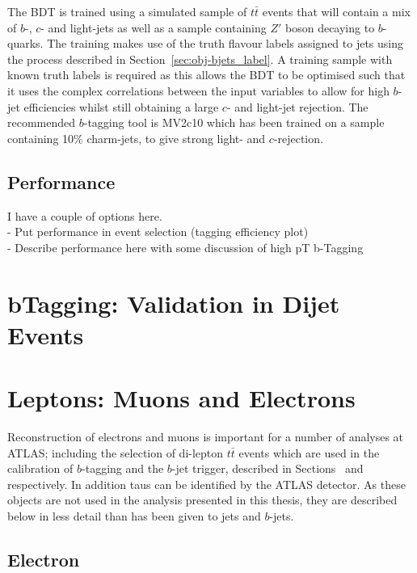 The BDT is trained using a simulated sample of $t\bar{t}$ events that will contain a mix of  $b$-, $c$- and light-jets
as well as a sample containing $Z'$ boson decaying to $b$-quarks.
The training makes use of the truth flavour labels assigned to jets using the process described in Section~\ref{sec:obj-bjets_label}.
A training sample with known truth labels is required as this allows the BDT to be optimised
such that it uses the complex correlations between the input variables to allow for high $b$-jet efficiencies
whilst still obtaining a large $c$- and light-jet rejection.
The recommended $b$-tagging tool is MV2c10 which has been trained on a sample containing 10\% charm-jets, to give strong light- and $c$-rejection.

\subsection{Performance}
\label{sec:obj-bjets_calib}

I have a couple of options here.\\
- Put performance in event selection (tagging efficiency plot)\\
- Describe performance here with some discussion of high pT b-Tagging

\section{bTagging: Validation in Dijet Events}

\section{Leptons: Muons and Electrons}   

Reconstruction of electrons and muons is important for a number of analyses at ATLAS;
including the selection of di-lepton $t\bar{t}$ events
which are used in the calibration of $b$-tagging and the $b$-jet trigger,
described in Sections~\label{sec:obj-bjets_calib} and~\label{sec:trig-bjet_eff} respectively.
In addition taus can be identified by the ATLAS detector.
As these objects are not used in the analysis presented in this thesis,
they are described below in less detail than has been given to jets and $b$-jets.

\subsection{Electron}
\label{sec:obj-electron}


